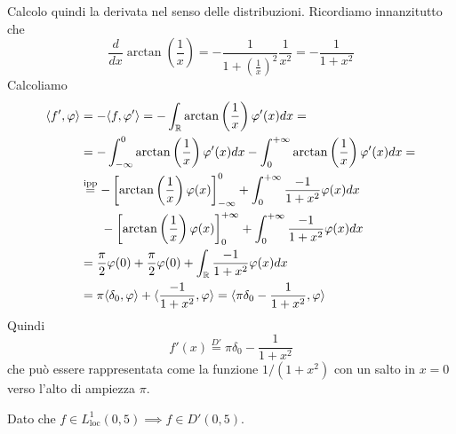 Calcolo quindi la derivata nel senso delle distribuzioni. Ricordiamo innanzitutto che
\begin{equation*}
\frac{d}{dx}\arctan\left(\frac{1}{x}\right) =-\frac{1}{1+\left(\frac{1}{x}\right)^{2}}\frac{1}{x^{2}} =-\frac{1}{1+x^{2}}
\end{equation*}
Calcoliamo
\begin{align*}
\langle f',\varphi \rangle  & =-\langle f,\varphi '\rangle =-\int _{\mathbb{R} }\arctan\left(\frac{1}{x}\right) \varphi '(x)dx=\\
 & =-\int ^{0}_{-\infty }\arctan\left(\frac{1}{x}\right) \varphi '(x)dx-\int ^{+\infty }_{0}\arctan\left(\frac{1}{x}\right) \varphi '(x)dx=\\
 & \overset{\text{ipp}}{=} -\left[\arctan\left(\frac{1}{x}\right) \varphi (x)\right]^{0}_{-\infty } +\int ^{+\infty }_{0}\frac{-1}{1+x^{2}} \varphi ( x) dx\\
 & \ \ \ \ \ -\left[\arctan\left(\frac{1}{x}\right) \varphi (x)\right]^{+\infty }_{0} +\int ^{+\infty }_{0}\frac{-1}{1+x^{2}} \varphi ( x) dx\\
 & =\frac{\pi }{2} \varphi ( 0) +\frac{\pi }{2} \varphi ( 0) +\int _{\mathbb{R} }\frac{-1}{1+x^{2}} \varphi (x)dx\\
 & =\pi \langle \delta _{0} ,\varphi \rangle +\langle \frac{-1}{1+x^{2}} ,\varphi \rangle =\langle \pi \delta _{0} -\frac{1}{1+x^{2}} ,\varphi \rangle 
\end{align*}
Quindi
\begin{equation*}
f'(x)\overset{D'}{=} \pi \delta _{0} -\frac{1}{1+x^{2}}
\end{equation*}
che può essere rappresentata come la funzione $1/\left( 1+x^{2}\right)$ con un salto in $x=0$ verso l'alto di ampiezza $\pi $.
\Soluzione

Dato che $f\in L^{1}_{\mathrm{loc}} (0,5)\implies f\in D'(0,5)$.


